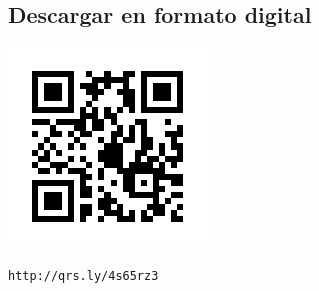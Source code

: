 \documentclass[a4paper, twocolumn]{article}
\begin{document}
\subsection*{Descargar en formato digital}
\includegraphics{qrcode}

\begin{verbatim}http://qrs.ly/4s65rz3\end{verbatim}
\end{document}

